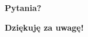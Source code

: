 \documentclass[a4paper, 11pt]{beamer}
\begin{document}
	\section*{}
	
	\begin{frame}
		\center
		\Huge \bfseries
		Pytania?
	\end{frame}

	\begin{frame}
		\center
		\Huge \bfseries
		Dziękuję za uwagę!
	\end{frame}
\end{document}

